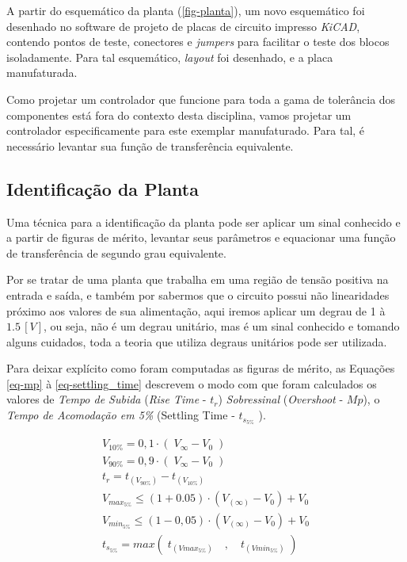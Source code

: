 \documentclass[
	12pt,				%
	article,			%
	openright,			%
	oneside,
	a4paper,			%
	chapter=TITLE,		%
	section=TITLE,		%
	english,			%
	french,				%
	spanish,			%
	brazil,				%
]{abntex2}
\begin{document}
        	A partir do esquemático da planta (\autoref{fig-planta}), um novo esquemático foi desenhado no software de projeto de placas de circuito impresso \textit{KiCAD}, contendo pontos de teste, conectores e \textit{jumpers} para facilitar o teste dos blocos isoladamente. Para tal esquemático, \textit{layout} foi desenhado, e a placa manufaturada.
        	
            Como projetar um controlador que funcione para toda a gama de tolerância dos componentes está fora do contexto desta disciplina, vamos projetar um controlador especificamente para este exemplar manufaturado. Para tal, é necessário levantar sua função de transferência equivalente.
    	
    	\subsection{Identificação da Planta}
    	
        	Uma técnica para a identificação da planta pode ser aplicar um sinal conhecido e a partir de figuras de mérito, levantar seus parâmetros e equacionar uma função de transferência de segundo grau equivalente.
        	
        	Por se tratar de uma planta que trabalha em uma região de tensão positiva na entrada e saída, e também por sabermos que o circuito possui não linearidades próximo aos valores de sua alimentação, aqui iremos aplicar um degrau de 1 à $1.5\,[V]$, ou seja, não é um degrau unitário, mas é um sinal conhecido e tomando alguns cuidados, toda a teoria que utiliza degraus unitários pode ser utilizada.
        	
        	Para deixar explícito como foram computadas as figuras de mérito, as Equações \ref{eq-mp} à \ref{eq-settling_time} descrevem o modo com que foram calculados os valores de \textit{Tempo de Subida} (\textit{Rise Time} - $t_r$) \textit{Sobressinal} (\textit{Overshoot} - $Mp$), o \textit{Tempo de Acomodação em 5\%} (Settling Time - $t_{s_{5\%}}$ ).
        	
        	\begin{eqnarray}
        		\nonumber
        		V_{10\%} = 0,1\cdot(\;V_{\infty} -V_{0}\;) \\
        		\nonumber
        		V_{90\%} = 0,9\cdot(\;V_{\infty} -V_{0}\;) \\
        		\label{eq-mp}
        		t_{r} = t_{(V_{90\%})} - t_{(V_{10\%})} \\
        		\nonumber
        		V_{max_{5\%}} \leq (1 +0.05) \cdot (V_{(\infty)} - V_{0}) +V_{0} \\
        		\nonumber
        		V_{min_{5\%}} \leq (1 -0,05) \cdot (V_{(\infty)} - V_{0}) +V_{0} \\
        		\label{eq-settling_time}
        		t_{s_{5\%}} = max\left(\; t_{(Vmax_{5\%})}\quad, \quad t_{(Vmin_{5\%})}\;\right)		
        	\end{eqnarray}
        	
\end{document}

